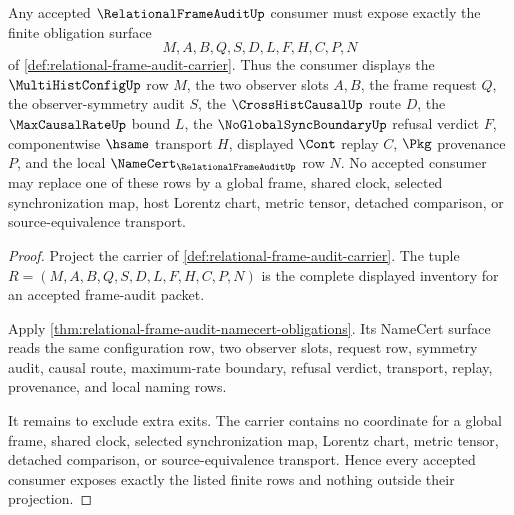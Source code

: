 \begin{theorem}
\label{thm:relational-frame-audit-obligation-totality}
Any accepted $\RelationalFrameAuditUp$ consumer must expose exactly the finite obligation surface
$$
M,A,B,Q,S,D,L,F,H,C,P,N
$$
of \autoref{def:relational-frame-audit-carrier}. Thus the consumer displays the $\MultiHistConfigUp$ row $M$, the two observer slots $A,B$, the frame request $Q$, the observer-symmetry audit $S$, the $\CrossHistCausalUp$ route $D$, the $\MaxCausalRateUp$ bound $L$, the $\NoGlobalSyncBoundaryUp$ refusal verdict $F$, componentwise $\hsame$ transport $H$, displayed $\Cont$ replay $C$, $\Pkg$ provenance $P$, and the local $\NameCert_{\RelationalFrameAuditUp}$ row $N$. No accepted consumer may replace one of these rows by a global frame, shared clock, selected synchronization map, host Lorentz chart, metric tensor, detached comparison, or source-equivalence transport.
\end{theorem}
\begin{proof}
Project the carrier of \autoref{def:relational-frame-audit-carrier}. The tuple $R=(M,A,B,Q,S,D,L,F,H,C,P,N)$ is the complete displayed inventory for an accepted frame-audit packet.

Apply \autoref{thm:relational-frame-audit-namecert-obligations}. Its NameCert surface reads the same configuration row, two observer slots, request row, symmetry audit, causal route, maximum-rate boundary, refusal verdict, transport, replay, provenance, and local naming rows.

It remains to exclude extra exits. The carrier contains no coordinate for a global frame, shared clock, selected synchronization map, Lorentz chart, metric tensor, detached comparison, or source-equivalence transport. Hence every accepted consumer exposes exactly the listed finite rows and nothing outside their projection.
\end{proof}

